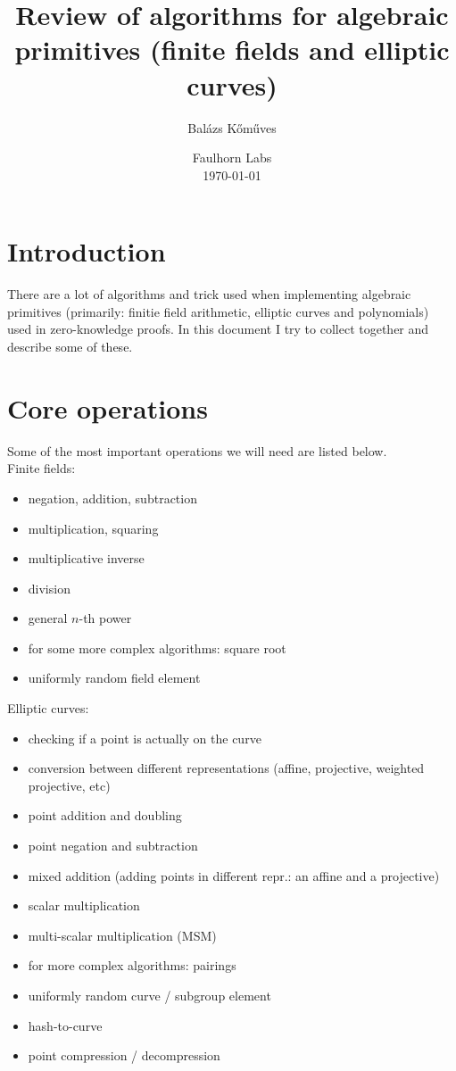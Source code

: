 \documentclass[12pt,draft,a4paper,openany,oneside]{amsbook}
\title{Review of algorithms for algebraic primitives (finite fields and elliptic curves)}
\author{Bal\'azs K\H{o}m\H{u}ves}
\date{%
Faulhorn Labs\\%
\today}
\theoremstyle{plain}
\theoremstyle{definition}
\begin{document}
\maketitle

\setcounter{tocdepth}{2}
\tableofcontents


\section{Introduction}

There are a lot of algorithms and trick used when implementing algebraic primitives
(primarily: finitie field arithmetic, elliptic curves and polynomials) used in
zero-knowledge proofs. In this document I try to collect together and describe
some of these.

\section{Core operations}

Some of the most important operations we will need are listed below.\\

Finite fields:
\begin{itemize}
\item negation, addition, subtraction
\item multiplication, squaring
\item multiplicative inverse
\item division
\item general $n$-th power
\item for some more complex algorithms: square root
\item uniformly random field element \\
\end{itemize}

Elliptic curves:
\begin{itemize}
\item checking if a point is actually on the curve
\item conversion between different representations (affine, projective, weighted projective, etc)
\item point addition and doubling
\item point negation and subtraction
\item mixed addition (adding points in different repr.: an affine and a projective)
\item scalar multiplication
\item multi-scalar multiplication (MSM)
\item for more complex algorithms: pairings
\item uniformly random curve / subgroup element
\item hash-to-curve
\item point compression / decompression \\
\end{itemize}
\end{document}
